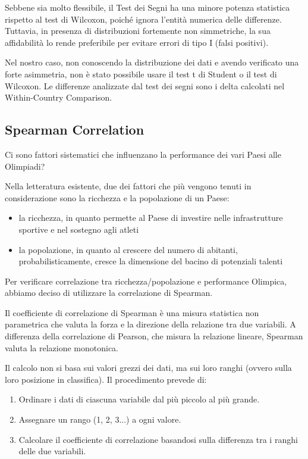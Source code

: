 Sebbene sia molto flessibile, il Test dei Segni ha una minore potenza statistica rispetto al test di Wilcoxon, poiché ignora l'entità numerica delle differenze. Tuttavia, in presenza di distribuzioni fortemente non simmetriche, la sua affidabilità lo rende preferibile per evitare errori di tipo I (falsi positivi).

Nel nostro caso, non conoscendo la distribuzione dei dati e avendo verificato una forte asimmetria, non è stato possibile usare il test t di Student o il test di Wilcoxon. Le differenze analizzate dal test dei segni sono i delta calcolati nel Within-Country Comparison.

\subsection*{Spearman Correlation}
Ci sono fattori sistematici che influenzano la performance dei vari Paesi alle Olimpiadi?

Nella letteratura esistente, due dei fattori che più vengono tenuti in considerazione sono la ricchezza e la popolazione di un Paese:
\begin{itemize}
    \item la ricchezza, in quanto permette al Paese di investire nelle infrastrutture sportive e nel sostegno agli atleti
    \item la popolazione, in quanto al crescere del numero di abitanti, probabilisticamente, cresce la dimensione del bacino di potenziali talenti
\end{itemize}

Per verificare correlazione tra ricchezza/popolazione e performance Olimpica, abbiamo deciso di utilizzare la correlazione di Spearman.

Il coefficiente di correlazione di Spearman è una misura statistica non parametrica che valuta la forza e la direzione della relazione tra due variabili. A differenza della correlazione di Pearson, che misura la relazione lineare, Spearman valuta la relazione monotonica.

Il calcolo non si basa sui valori grezzi dei dati, ma sui loro ranghi (ovvero sulla loro posizione in classifica). Il procedimento prevede di:

\begin{enumerate}
    \item Ordinare i dati di ciascuna variabile dal più piccolo al più grande.
    \item Assegnare un rango (1, 2, 3...) a ogni valore.
    \item Calcolare il coefficiente di correlazione basandosi sulla differenza tra i ranghi delle due variabili.
\end{enumerate}

